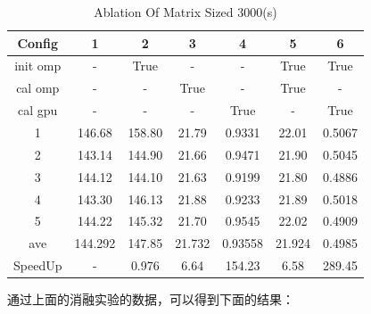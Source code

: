 \documentclass{article}
\begin{document}
\begin{table}[H]
    \centering
    \begin{tabular}{|c|c|c|c|c|c|c|}
        \hline
        Config & 1 & 2 & 3 & 4 & 5 & 6 \\
        \hline
        init omp & - & True & - & - & True & True\\
        \hline
        cal omp & - & - & True & - & True & - \\
        \hline
        cal gpu & - & - & - & True & - & True \\
        \hline
        1 & 146.68 & 158.80 & 21.79 & 0.9331 & 22.01 & 0.5067\\
        2 & 143.14 & 144.90 & 21.66 & 0.9471 & 21.90 & 0.5045\\
        3 & 144.12 & 144.10 & 21.63 & 0.9199 & 21.80 & 0.4886\\
        4 & 143.30 & 146.13 & 21.88 & 0.9233 & 21.89 & 0.5018\\
        5 & 144.22 & 145.32 & 21.70 & 0.9545 & 22.02 & 0.4909\\
        \hline
        ave & 144.292 & 147.85 & 21.732 & 0.93558 & 21.924 & 0.4985 \\
        \hline
        SpeedUp & - & 0.976 & 6.64 & 154.23 & 6.58 & 289.45\\
        \hline
    \end{tabular}
    \caption{Ablation Of Matrix Sized 3000(s)}
    \label{tab:3}
\end{table}
通过上面的消融实验的数据，可以得到下面的结果：
\end{document}
